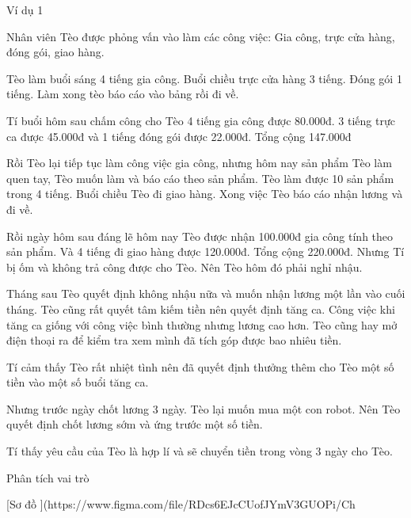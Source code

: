 \documentclass{report}
\begin{document}
Ví dụ 1

Nhân viên Tèo được phỏng vấn vào làm các công việc: Gia công, trực cửa hàng, đóng gói, giao hàng.

Tèo làm buổi sáng 4 tiếng gia công. Buổi chiều trực cửa hàng 3 tiếng. Đóng gói 1 tiếng. Làm xong tèo báo cáo vào bảng
rồi đi về.

Tí buổi hôm sau chấm công cho Tèo 4 tiếng gia công được 80.000đ. 3 tiếng trực ca được 45.000đ và 1 tiếng đóng gói được
22.000đ. Tổng cộng 147.000đ

Rồi Tèo lại tiếp tục làm công việc gia công, nhưng hôm nay sản phẩm Tèo làm quen tay, Tèo muốn làm và báo cáo theo sản
phẩm. Tèo làm được 10 sản phẩm trong 4 tiếng. Buổi chiều Tèo đi giao hàng. Xong việc Tèo báo cáo nhận lương và đi về.

Rồi ngày hôm sau đáng lẽ hôm nay Tèo được nhận 100.000đ gia công tính theo sản phẩm. Và 4 tiếng đi giao hàng được
120.000đ. Tổng cộng 220.000đ. Nhưng Tí bị ốm và không trả công được cho Tèo. Nên Tèo hôm đó phải nghỉ nhậu.

Tháng sau Tèo quyết định không nhậu nữa và muốn nhận lương một lần vào cuối tháng. Tèo cũng rất quyết tâm kiếm tiền nên
quyết định tăng ca. Công việc khi tăng ca giống với công việc bình thường nhưng lương cao hơn. Tèo cũng hay mở điện
thoại ra để kiểm tra xem mình đã tích góp được bao nhiêu tiền.

Tí cảm thấy Tèo rất nhiệt tình nên đã quyết định thưởng thêm cho Tèo một số tiền vào một số buổi tăng ca.

Nhưng trước ngày chốt lương 3 ngày. Tèo lại muốn mua một con robot. Nên Tèo quyết định chốt lương sớm và ứng trước một
số tiền.

Tí thấy yêu cầu của Tèo là hợp lí và sẽ chuyển tiền trong vòng 3 ngày cho Tèo.

Phân tích vai trò

[Sơ đồ ](https://www.figma.com/file/RDcs6EJcCUofJYmV3GUOPi/Ch%




\end{document}
